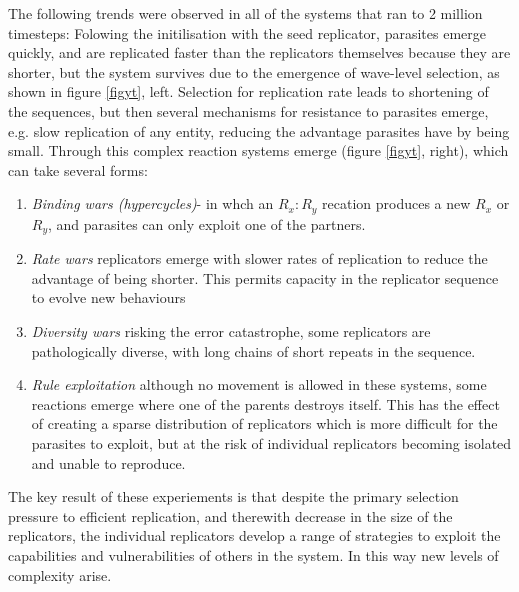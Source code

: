 \documentclass[twocolumn]{article}
\providecommand{\tightlist}{%
  \setlength{\itemsep}{0pt}\setlength{\parskip}{0pt}}
\begin{document}
The following trends were observed in all of the systems that ran to 2 million timesteps:
Folowing the initilisation with the seed replicator, parasites emerge quickly, and are replicated faster than the replicators themselves because they are shorter, but the system survives due to the emergence of wave-level selection, as shown in figure \ref{figyt}, left.
Selection for replication rate leads to shortening of the sequences, but then several mechanisms for resistance to parasites emerge, e.g.  slow replication of any
entity, reducing the advantage parasites have by being small. Through this complex reaction systems emerge (figure \ref{figyt}, right), which can take several forms:

\begin{enumerate}
\def\labelenumi{\arabic{enumi}.}
\tightlist
\item
  \emph{Binding wars (hypercycles)}- in whch an $R_x:R_y$ recation
  produces a new $R_x$ or $R_y$, and parasites can only exploit one of the
  partners.
\item
  \emph{Rate wars} replicators emerge with slower rates of replication
  to reduce the advantage of being shorter. This permits capacity in the
  replicator sequence to evolve new behaviours
\item
  \emph{Diversity wars} risking the error catastrophe, some replicators
  are pathologically diverse, with long chains of short repeats in the sequence.
\item
  \emph{Rule exploitation} although no movement is allowed in these
  systems, some reactions emerge where one of the parents destroys
  itself. This has the effect of creating a sparse distribution of
  replicators which is more difficult for the parasites to exploit, but at the
  risk of individual replicators becoming isolated and unable to
  reproduce.
\end{enumerate}

The key result of these experiements is that despite  the primary selection pressure
to efficient replication, and therewith decrease in the size of the replicators,
 the individual replicators   develop a
range of strategies to exploit the capabilities and vulnerabilities
of others in the system. In this way new levels of complexity arise.
\end{document}
